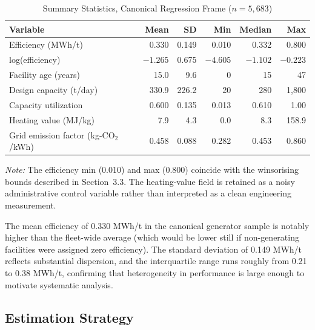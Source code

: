 \documentclass[12pt,a4paper]{article}
\begin{document}
\begin{table}[H]
  \centering
  \caption{Summary Statistics, Canonical Regression Frame ($n = 5{,}683$)}
  \label{tab:summary_stats}
  \begin{tabular*}{\textwidth}{@{\extracolsep{\fill}}l*{5}{r}@{}}
    \toprule
    Variable & Mean & SD & Min & Median & Max \\
    \midrule
    Efficiency (MWh/t)                     & 0.330    & 0.149 & 0.010    & 0.332    & 0.800    \\
    log(efficiency)                        & $-1.265$ & 0.675 & $-4.605$ & $-1.102$ & $-0.223$ \\
    Facility age (years)                   & 15.0     & 9.6   & 0        & 15       & 47       \\
    Design capacity (t/day)                & 330.9    & 226.2 & 20       & 280      & 1{,}800  \\
    Capacity utilization                   & 0.600    & 0.135 & 0.013    & 0.610    & 1.00     \\
    Heating value (MJ/kg)                  & 7.9      & 4.3   & 0.0      & 8.3      & 158.9    \\
    Grid emission factor (kg-CO$_2$/kWh)   & 0.458    & 0.088 & 0.282    & 0.453    & 0.860    \\
    \bottomrule
  \end{tabular*}
  \smallskip
  \begin{minipage}{\textwidth}
    \footnotesize\emph{Note:} The efficiency min (0.010) and max (0.800) coincide with the winsorising bounds described in Section~3.3. The heating-value field is retained as a noisy administrative control variable rather than interpreted as a clean engineering measurement.
  \end{minipage}
\end{table}

The mean efficiency of 0.330 MWh/t in the canonical generator sample is notably higher than the fleet-wide average (which would be lower still if non-generating facilities were assigned zero efficiency). The standard deviation of 0.149 MWh/t reflects substantial dispersion, and the interquartile range runs roughly from 0.21 to 0.38 MWh/t, confirming that heterogeneity in performance is large enough to motivate systematic analysis.

\subsection{Estimation Strategy}
\end{document}
